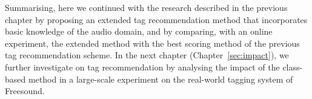 Summarising, here we continued with the research described in the previous chapter by proposing an extended tag recommendation method that incorporates basic knowledge of the audio domain, and by comparing, with an online experiment, the extended method with the best scoring method of the previous tag recommendation scheme.
In the next chapter (Chapter~\ref{sec:impact}), we further investigate on tag recommendation by analysing the impact of the class-based method in a large-scale experiment on the real-world tagging system of Freesound.






